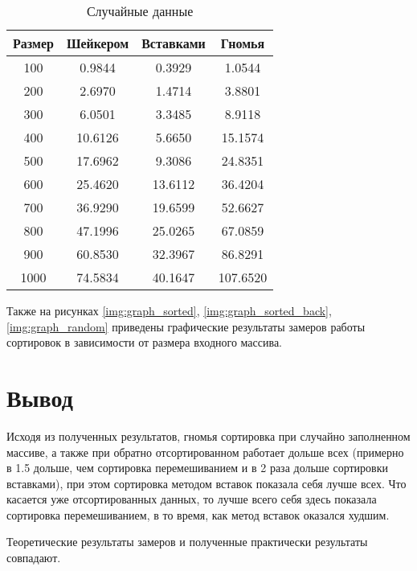 \begin{table}[h]
	\begin{center}
		\begin{threeparttable}
		\captionsetup{justification=raggedleft,singlelinecheck=off}
		\caption{Случайные данные}
		\label{tbl:random}
		\begin{tabular}{|c|c|c|c|}
			\hline
			 Размер & Шейкером &  Вставками &  Гномья \\
			\hline
			100 & 0.9844 & 0.3929 & 1.0544 \\ 
			\hline
			200 & 2.6970 & 1.4714 & 3.8801 \\ 
			\hline
			300 & 6.0501 & 3.3485 & 8.9118 \\ 
			\hline
			400 & 10.6126 & 5.6650 & 15.1574 \\ 
			\hline
			500 & 17.6962 & 9.3086 & 24.8351 \\ 
			\hline
			600 & 25.4620 & 13.6112 & 36.4204 \\ 
			\hline
			700 & 36.9290 & 19.6599 & 52.6627 \\ 
			\hline
			800 & 47.1996 & 25.0265 & 67.0859 \\ 
			\hline
			900 & 60.8530 & 32.3967 & 86.8291 \\ 
			\hline
			1000 & 74.5834 & 40.1647 & 107.6520 \\ 
			\hline
		\end{tabular}
		\end{threeparttable}
    \end{center}
\end{table}


Также на рисунках \ref{img:graph_sorted}, \ref{img:graph_sorted_back}, \ref{img:graph_random} приведены графические результаты замеров работы сортировок в зависимости от размера входного массива.


\clearpage

\section*{Вывод}
Исходя из полученных результатов, гномья сортировка при случайно заполненном массиве, а также при обратно отсортированном работает дольше всех (примерно в 1.5 дольше, чем сортировка перемешиванием и в 2 раза дольше сортировки вставками), при этом сортировка методом вставок показала себя лучше всех. Что касается уже отсортированных данных, то лучше всего себя здесь показала сортировка перемешиванием, в то время, как метод вставок оказался худшим.

Теоретические результаты замеров и полученные практически результаты совпадают.